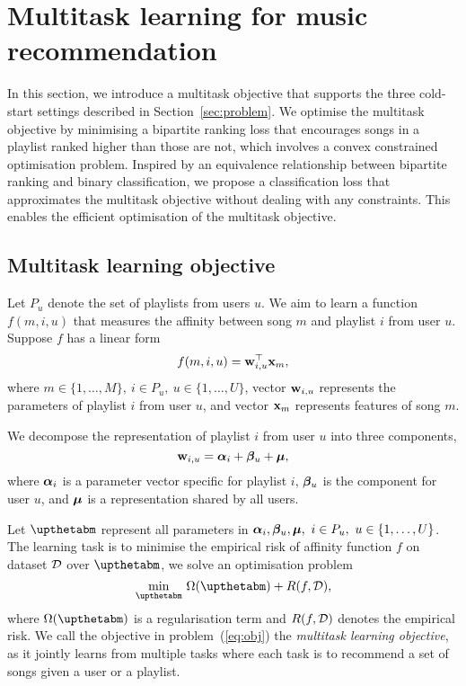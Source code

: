 \section{Multitask learning for music recommendation}
\label{sec:method}

In this section, we introduce a multitask objective that supports the three cold-start settings
described in Section~\ref{sec:problem}. 
We optimise the multitask objective by minimising a bipartite ranking loss that encourages songs in a playlist
ranked higher than those are not, which involves a convex constrained optimisation problem.
Inspired by an equivalence relationship between bipartite ranking and binary classification, 
we propose a classification loss that approximates the multitask objective without dealing with any constraints.
This enables the efficient optimisation of the multitask objective.



\subsection{Multitask learning objective}

Let $P_u$ denote the set of playlists from users $u$.
We aim to learn a function $f(m, i, u)$ that measures the affinity between song $m$ and playlist $i$ from user $u$.
Suppose $f$ has a linear form
\begin{equation}
\label{eq:scorefunc}
f(m, i, u) = \mathbf{w}_{i,u}^\top \mathbf{x}_m,
\end{equation}
where $m \in \{1,\dots,M\}, \ i \in P_u, \ u \in \{1,\dots,U\}$,
vector $\mathbf{w}_{i,u}$ represents the parameters of playlist $i$ from user $u$,
and vector $\mathbf{x}_m$ represents features of song $m$.

We decompose the representation of playlist $i$ from user $u$ %
into three components, \ie
$$
\mathbf{w}_{i,u} = {\bm{\alpha}}_i + {\bm{\beta}}_u + \bm{\mu},
$$
where ${\bm{\alpha}}_i$ is a parameter vector specific for playlist $i$,
${\bm{\beta}}_u$ is the component for user $u$,
and $\bm{\mu}$ is a representation shared by all users.

Let $\upthetabm$ represent all parameters in $\alphabm_i, \betabm_u, \bmu, \ i \in P_u, \ u \in \{1,\dots,U\}$.
The learning task is to minimise the empirical risk of affinity function $f$ on dataset $\mathcal{D}$ over $\upthetabm$,
\ie we solve an optimisation problem
\begin{equation}
\label{eq:obj}
\min_{\upthetabm} \, \Omega(\upthetabm) + R(f, \DCal),
\end{equation}
where $\Omega(\upthetabm)$ is a regularisation term and $R(f, \mathcal{D})$ denotes the empirical risk.
We call the objective in problem~(\ref{eq:obj}) the {\it multitask learning objective},
as it jointly learns from multiple tasks where each task is to recommend a set of songs given a user or a playlist.

